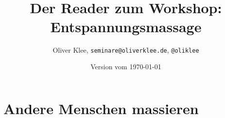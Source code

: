 \documentclass[a4paper,twoside,11pt,titlepage,openany]{scrbook}
\author{Oliver Klee, \texttt{seminare@oliverklee.de}, \texttt{@oliklee}}
\title{Der Reader zum Workshop: Entspannungsmassage}
\date{Version vom \today}
\begin{document}
\nocite*{}

\maketitle
\frontmatter





\tableofcontents

\mainmatter



\chapter{Andere Menschen massieren}









\backmatter

\end{document}
